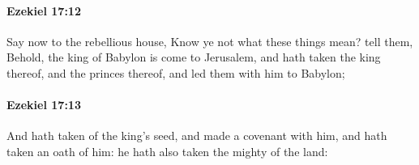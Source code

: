 		\paragraph{Ezekiel 17:12} %
			\label{EZEKIEL-17-12}

			Say now to the rebellious house, Know ye not what these things mean? tell them, Behold, the king of Babylon is come to Jerusalem, and hath taken the king thereof, and the princes thereof, and led them with him to Babylon;


		\paragraph{Ezekiel 17:13} %
			\label{EZEKIEL-17-13}

			And hath taken of the king’s seed, and made a covenant with him, and hath taken an oath of him: he hath also taken the mighty of the land:


